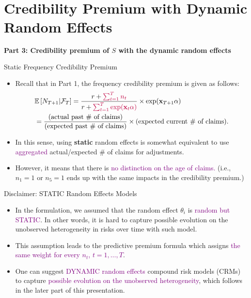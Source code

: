 \documentclass[ignorenonframetext,]{beamer}
\begin{document}
\section{Credibility Premium with Dynamic Random Effects}


\begin{frame}
\centering
\Large\textbf{Part 3: Credibility premium of $S$ with the dynamic random effects}
\end{frame}

\begin{frame}{Static Frequency Credibility Premium}
\begin{itemize}
\item Recall that in Part 1, the frequency credibility premium is given as follows:
\begin{align*}
&{\mathbb E}\left[N_{T+1}|\mathcal{F}_T\right] = \frac{r+\textcolor{purple}{\sum_{t=1}^T n_t}}{r+\textcolor{purple}{\sum_{t=1}^T \exp(\mathbf{x}_t\alpha)}}\times \exp(\mathbf{x}_{T+1}\alpha) \\
&= \frac{\text{(actual past \# of claims)}}{\text{(expected past \# of claims)}} \times \text{(expected current \# of claims)}.
\end{align*}
\pause
\item In this sense, using \textbf{static} random effects is somewhat equivalent to use
\textcolor{purple}{aggregated} actual/expected \# of claims for adjustments.
\pause
\item However, it means that there is \textcolor{purple}{no distinction on the age of claims.}
(i.e., $n_1=1$ or $n_5=1$ ends up with the same impacts in the credibility premium.)
\end{itemize}
\end{frame}

\begin{frame}{Disclaimer: STATIC Random Effects Models}
\begin{itemize}
\item In the formulation, we assumed that the random effect $\theta_i$ is
\textcolor{purple}{random but STATIC}. In other words, it is hard to capture possible evolution
on the unobserved heterogeneity in risks over time with such model.
\pause
\item This assumption leads to the predictive premium formula which assigns
\textcolor{purple}{the same weight for every $n_t$, $t=1,\ldots,T$}.
\pause
\item One can suggest \textcolor{purple}{DYNAMIC random effects} compound risk models (CRMs) to capture
\textcolor{purple}{possible evolution on the unobserved heterogeneity}, which follows in the later part of this presentation.
\end{itemize}
\end{frame}
\end{document}
